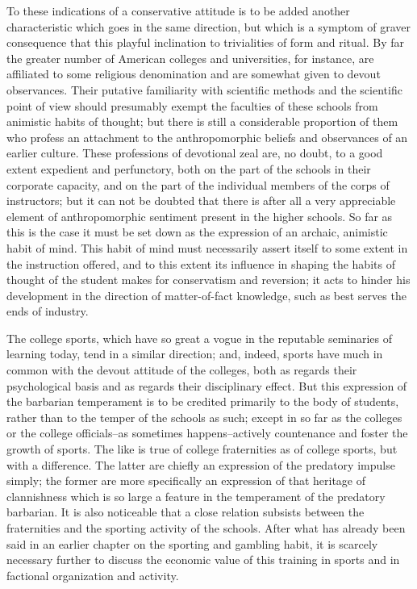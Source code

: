 \documentclass[12pt]{report}
\begin{document}
To these indications of a conservative attitude is to be added another
characteristic which goes in the same direction, but which is a symptom
of graver consequence that this playful inclination to trivialities
of form and ritual. By far the greater number of American colleges
and universities, for instance, are affiliated to some religious
denomination and are somewhat given to devout observances. Their
putative familiarity with scientific methods and the scientific point
of view should presumably exempt the faculties of these schools
from animistic habits of thought; but there is still a considerable
proportion of them who profess an attachment to the anthropomorphic
beliefs and observances of an earlier culture. These professions
of devotional zeal are, no doubt, to a good extent expedient and
perfunctory, both on the part of the schools in their corporate
capacity, and on the part of the individual members of the corps of
instructors; but it can not be doubted that there is after all a very
appreciable element of anthropomorphic sentiment present in the
higher schools. So far as this is the case it must be set down as the
expression of an archaic, animistic habit of mind. This habit of
mind must necessarily assert itself to some extent in the instruction
offered, and to this extent its influence in shaping the habits of
thought of the student makes for conservatism and reversion; it acts
to hinder his development in the direction of matter-of-fact knowledge,
such as best serves the ends of industry.

The college sports, which have so great a vogue in the reputable
seminaries of learning today, tend in a similar direction; and, indeed,
sports have much in common with the devout attitude of the colleges,
both as regards their psychological basis and as regards their
disciplinary effect. But this expression of the barbarian temperament
is to be credited primarily to the body of students, rather than to the
temper of the schools as such; except in so far as the colleges or the
college officials--as sometimes happens--actively countenance and foster
the growth of sports. The like is true of college fraternities as
of college sports, but with a difference. The latter are chiefly
an expression of the predatory impulse simply; the former are more
specifically an expression of that heritage of clannishness which is
so large a feature in the temperament of the predatory barbarian. It is
also noticeable that a close relation subsists between the fraternities
and the sporting activity of the schools. After what has already been
said in an earlier chapter on the sporting and gambling habit, it
is scarcely necessary further to discuss the economic value of this
training in sports and in factional organization and activity.
\end{document}
